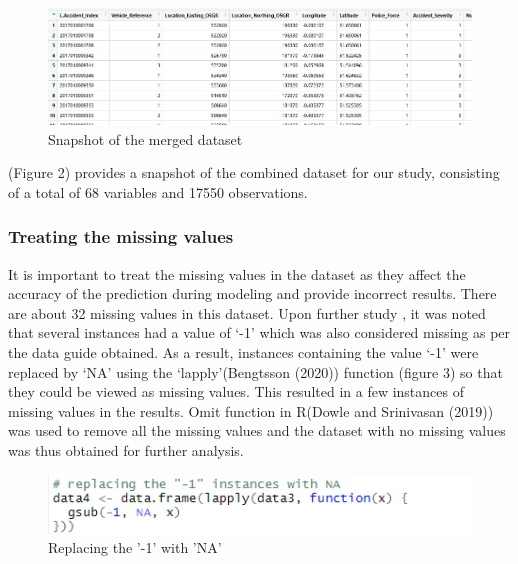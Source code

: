 \documentclass[
  a4paper,
]{article}
\begin{document}
\begin{figure}[h!]

{\centering \includegraphics[width=13.54in,height=0.16\textheight]{figure 1} 

}

\caption{Snapshot of the merged dataset}\label{fig:unnamed-chunk-3}
\end{figure}

(Figure 2) provides a snapshot of the combined dataset for our study,
consisting of a total of 68 variables and 17550 observations.

\hypertarget{treating-the-missing-values}{%
\subsubsection{Treating the missing
values}\label{treating-the-missing-values}}

It is important to treat the missing values in the dataset as they
affect the accuracy of the prediction during modeling and provide
incorrect results. There are about 32 missing values in this dataset.
Upon further study , it was noted that several instances had a value of
`-1' which was also considered missing as per the data guide obtained.
As a result, instances containing the value `-1' were replaced by `NA'
using the `lapply'(Bengtsson (2020)) function (figure 3) so that they
could be viewed as missing values. This resulted in a few instances of
missing values in the results. Omit function in R(Dowle and Srinivasan
(2019)) was used to remove all the missing values and the dataset with
no missing values was thus obtained for further analysis.

\begin{figure}[h!]

{\centering \includegraphics[width=0.75\linewidth]{figure 3} 

}

\caption{Replacing the '-1' with 'NA'}\label{fig:unnamed-chunk-4}
\end{figure}
\end{document}
